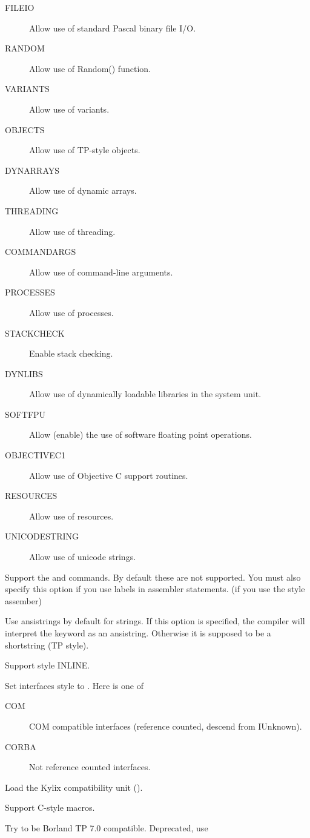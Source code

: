 \begin{description}
\begin{description}
\item[FILEIO] Allow use of standard  Pascal binary file I/O.
\item[RANDOM] Allow use of Random() function.
\item[VARIANTS] Allow use of variants.
\item[OBJECTS] Allow use of TP-style objects.
\item[DYNARRAYS] Allow use of dynamic arrays.
\item[THREADING] Allow use of threading.
\item[COMMANDARGS] Allow use of command-line arguments.
\item[PROCESSES] Allow use of processes.
\item[STACKCHECK] Enable stack checking.
\item[DYNLIBS] Allow use of dynamically loadable libraries in the system unit.
\item[SOFTFPU] Allow (enable) the use of software floating point operations.
\item[OBJECTIVEC1] Allow use of Objective C support routines.
\item[RESOURCES] Allow use of resources.
\item[UNICODESTRING] Allow use of unicode strings.
\end{description}
\item [-Sg]  Support the  and  commands. By
default these are not supported. You must also specify this option if you
use labels in assembler statements. (if you use the  style
assember)
\item [-Sh] Use ansistrings by default for strings. If this option is
specified, the compiler will interpret the  keyword as an
ansistring. Otherwise it is supposed to be a shortstring (TP style).
\item [-Si]  Support  style INLINE.
\item [-SIXXX] Set interfaces style to  . Here  is one of
\begin{description}
\item[COM] COM compatible interfaces (reference counted, descend from IUnknown).
\item[CORBA] Not reference counted interfaces.
\end{description}
\item [-Sk] Load the Kylix compatibility unit ().
\item [-Sm]  Support C-style macros.
\item [-So]  Try to be Borland TP 7.0 compatible. Deprecated, use

\end{description}
